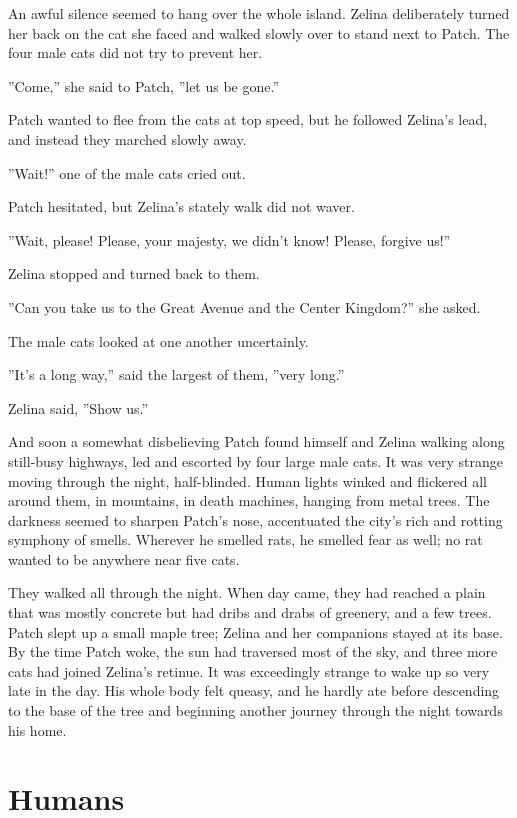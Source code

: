 \documentclass[12pt]{book}
\begin{document}
 An awful silence seemed to hang over the whole island. Zelina deliberately turned her back on the cat she faced and walked slowly over to stand next to Patch. The four male cats did not try to prevent her.\par
 ''Come,'' she said to Patch, ''let us be gone.''\par
 Patch wanted to flee from the cats at top speed, but he followed Zelina's lead, and instead they marched slowly away.\par
 ''Wait!'' one of the male cats cried out.\par
 Patch hesitated, but Zelina's stately walk did not waver.\par
 ''Wait, please! Please, your majesty, we didn't know! Please, forgive us!''\par
 Zelina stopped and turned back to them.\par
 ''Can you take us to the Great Avenue and the Center Kingdom?'' she asked.\par
 The male cats looked at one another uncertainly.\par
 ''It's a long way,'' said the largest of them, ''very long.''\par
 Zelina said, ''Show us.''\par
 And soon a somewhat disbelieving Patch found himself and Zelina walking along still-busy highways, led and escorted by four large male cats. It was very strange moving through the night, half-blinded. Human lights winked and flickered all around them, in mountains, in death machines, hanging from metal trees. The darkness seemed to sharpen Patch's nose, accentuated the city's rich and rotting symphony of smells. Wherever he smelled rats, he smelled fear as well; no rat wanted to be anywhere near five cats.\par
 They walked all through the night. When day came, they had reached a plain that was mostly concrete but had dribs and drabs of greenery, and a few trees. Patch slept up a small maple tree; Zelina and her companions stayed at its base. By the time Patch woke, the sun had traversed most of the sky, and three more cats had joined Zelina's retinue. It was exceedingly strange to wake up so very late in the day. His whole body felt queasy, and he hardly ate before descending to the base of the tree and beginning another journey through the night towards his home.\par

\section{Humans}
\end{document}
